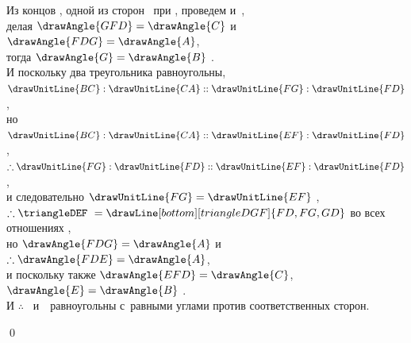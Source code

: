 \documentclass[letters,booklanguage=russian]{byrnebook}
\begin{document}
\begin{center}
Из концов , одной из сторон \triangleDEF\ при , проведем  и~,\\
делая $\drawAngle{GFD} = \drawAngle{C}$ и~$\drawAngle{FDG} = \drawAngle{A}$,\\
тогда $\drawAngle{G} = \drawAngle{B}$ .\\
И поскольку два треугольника равноугольны,\\
$\drawUnitLine{BC} : \drawUnitLine{CA} :: \drawUnitLine{FG} : \drawUnitLine{FD}$ ,\\
но $\drawUnitLine{BC} : \drawUnitLine{CA} :: \drawUnitLine{EF} : \drawUnitLine{FD}$ \byref{\hypref},
$\therefore \drawUnitLine{FG} : \drawUnitLine{FD} :: \drawUnitLine{EF} : \drawUnitLine{FD}$ ,\\
и следовательно $\drawUnitLine{FG} = \drawUnitLine{EF}$ ,\\
$\therefore \triangleDEF\ =
\drawLine[bottom][triangleDGF]{FD,FG,GD}$ во всех отношениях ,\\
но $\drawAngle{FDG} = \drawAngle{A}$ \byref{\constref} и~$\therefore \drawAngle{FDE} = \drawAngle{A}$,\\
и поскольку также $\drawAngle{EFD} = \drawAngle{C}$,\\
$\drawAngle{E} = \drawAngle{B}$ .\\
И $\therefore$ \triangleABC\ и~\triangleDEF\ равноугольны с~равными углами против соответственных сторон.
\end{center}

\qed
\end{document}
